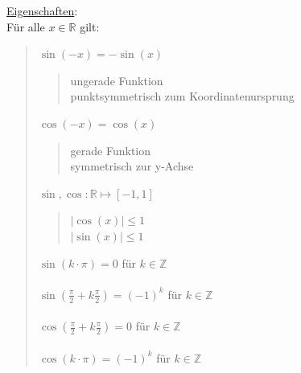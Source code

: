 \underline{Eigenschaften}:\\
Für alle $ x\in \mathbb{R} $ gilt:\\
\begin{quote}
	\textbullet\;\;$ \sin(-x)=-\sin(x) $
	\begin{quote}
		ungerade Funktion \\
		punktsymmetrisch zum Koordinatenursprung\\
	\end{quote}
	\textbullet\;\;$ \cos(-x)=\cos(x) $
	\begin{quote}
		gerade Funktion\\
		symmetrisch zur y-Achse\\
	\end{quote}
	\newpage
	\noindent
	\textbullet\;\;$ \sin, \cos: \mathbb{R}\longmapsto[-1,1] $
	\begin{quote}
		$|\cos(x)|\leq 1$\\
		$|\sin(x)|\leq 1$\\
	\end{quote}
	\textbullet\;\;$\sin(k\cdot\pi)=0$ für $ k\in \mathbb{Z} $\\ \\
	\textbullet\;\;$\sin(\frac{\pi}{2}+k\frac{\pi}{2})=(-1)^k$ für $ k\in \mathbb{Z} $\\ \\
	\textbullet\;\;$\cos(\frac{\pi}{2}+k\frac{\pi}{2})=0 $ für $ k\in \mathbb{Z} $\\ \\
	\textbullet\;\;$ \cos(k\cdot\pi)=(-1)^k $ für $ k\in \mathbb{Z} $\\
\end{quote}
